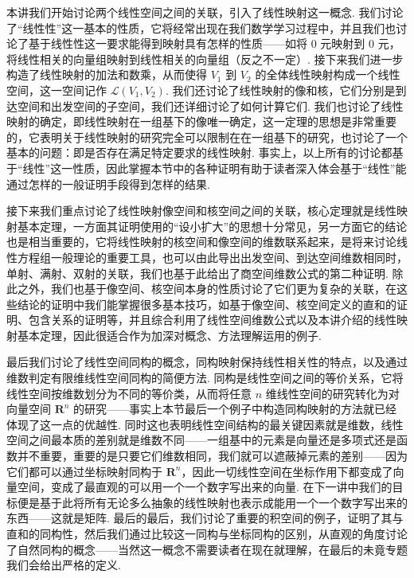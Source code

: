 \begin{summary}

    本讲我们开始讨论两个线性空间之间的关联，引入了线性映射这一概念. 我们讨论了``线性性''这一基本的性质，它将经常出现在我们数学学习过程中，并且我们也讨论了基于线性性这一要求能得到映射具有怎样的性质——如将 $0$ 元映射到 $0$ 元，将线性相关的向量组映射到线性相关的向量组（反之不一定）. 接下来我们进一步构造了线性映射的加法和数乘，从而使得 $V_1$ 到 $V_2$ 的全体线性映射构成一个线性空间，这一空间记作 $\mathcal{L}(V_1,V_2)$. 我们还讨论了线性映射的像和核，它们分别是到达空间和出发空间的子空间，我们还详细讨论了如何计算它们. 我们也讨论了线性映射的确定，即线性映射在一组基下的像唯一确定，这一定理的思想是非常重要的，它表明关于线性映射的研究完全可以限制在在一组基下的研究，也讨论了一个基本的问题：即是否存在满足特定要求的线性映射. 事实上，以上所有的讨论都基于``线性''这一性质，因此掌握本节中的各种证明有助于读者深入体会基于``线性''能通过怎样的一般证明手段得到怎样的结果.

    接下来我们重点讨论了线性映射像空间和核空间之间的关联，核心定理就是线性映射基本定理，一方面其证明使用的``设小扩大''的思想十分常见，另一方面它的结论也是相当重要的，它将线性映射的核空间和像空间的维数联系起来，是将来讨论线性方程组一般理论的重要工具，也可以由此导出出发空间、到达空间维数相同时，单射、满射、双射的关联，我们也基于此给出了商空间维数公式的第二种证明. 除此之外，我们也基于像空间、核空间本身的性质讨论了它们更为复杂的关联，在这些结论的证明中我们能掌握很多基本技巧，如基于像空间、核空间定义的直和的证明、包含关系的证明等，并且综合利用了线性空间维数公式以及本讲介绍的线性映射基本定理，因此很适合作为加深对概念、方法理解运用的例子.

    最后我们讨论了线性空间同构的概念，同构映射保持线性相关性的特点，以及通过维数判定有限维线性空间同构的简便方法. 同构是线性空间之间的等价关系，它将线性空间按维数划分为不同的等价类，从而将任意 $n$ 维线性空间的研究转化为对向量空间 $\mathbf{R}^n$ 的研究——事实上本节最后一个例子中构造同构映射的方法就已经体现了这一点的优越性. 同时这也表明线性空间结构的最关键因素就是维数，线性空间之间最本质的差别就是维数不同——一组基中的元素是向量还是多项式还是函数并不重要，重要的是只要它们维数相同，我们就可以遮蔽掉元素的差别——因为它们都可以通过坐标映射同构于 $\mathbf{R}^n$，因此一切线性空间在坐标作用下都变成了向量空间，变成了最直观的可以用一个一个数字写出来的向量. 在下一讲中我们的目标便是基于此将所有无论多么抽象的线性映射也表示成能用一个一个数字写出来的东西——这就是矩阵. 最后的最后，我们讨论了重要的积空间的例子，证明了其与直和的同构性，然后我们通过比较这一同构与坐标同构的区别，从直观的角度讨论了自然同构的概念——当然这一概念不需要读者在现在就理解，在最后的未竟专题我们会给出严格的定义.

\end{summary}

